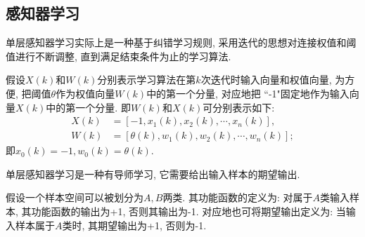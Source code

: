 \subsection{感知器学习}
单层感知器学习实际上是一种基于纠错学习规则, 采用迭代的思想对连接权值和阈值进行不断调整, 直到满足结束条件为止的学习算法.

假设$X (k)$和$W(k)$分别表示学习算法在第$k$次迭代时输入向量和权值向量, 为方便, 把阈值$\theta$作为权值向量$W (k)$中的第一个分量, 对应地把 ``-1"固定地作为输入向量$X (k)$中的第一个分量. 即$W (k)$和$X (k)$可分别表示如下:
\begin{align}
    X (k)&=[-1, x_1 (k), x_2 (k),\cdots, x_n (k)],\\
    W (k)&=[\theta (k),w_1 (k), w_2 (k),\cdots,w_n (k)];
\end{align}
即$x_0 (k)=-1, w_0 (k)=\theta (k)$.

\begin{remark}
    单层感知器学习是一种有导师学习, 它需要给出输入样本的期望输出.
\end{remark}

假设一个样本空间可以被划分为$A, B$两类. 其功能函数的定义为: 对属于$A$类输入样本, 其功能函数的输出为+1, 否则其输出为-1.
对应地也可将期望输出定义为: 当输入样本属于$A$类时, 其期望输出为+1, 否则为-1.

